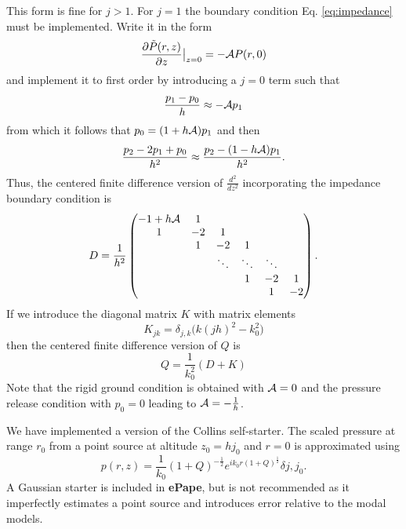 This form is fine for $j>1$. For $j=1$ the boundary condition Eq. \ref{eq:impedance} must be implemented. Write it in the form 
\[
\frac{\partial \tilde P(r,z)}{\partial z}\big|_{z=0}=-{\cal A}P(r,0)
\]
and implement it to first order by introducing a $j=0$ term such that 
\[
\frac{p_1-p_0}{h}\approx -{\cal A}p_1
\]
from which it follows that $p_0=(1+h{\cal A})p_1$ and then 
\[
\frac{p_{2}-2p_1+p_0}{h^2}\approx \frac{p_{2}-(1-h{\cal A})p_1}{h^2}.
\]
Thus, the centered finite difference version of $\frac{d^2}{dz^2}$ incorporating the impedance boundary condition is 
\begin{equation}\label{eq:Discrete_d^2}
D=
\frac{1}{h^2}\begin{pmatrix}
-1+h{\cal A}&1& &&&\\
1&-2&1&&&\\
&1&-2&1&&\\
&&\ddots&\ddots&\ddots&\\
&&& 1&-2&1\\
&&& &1&-2
\end{pmatrix}.
\end{equation}
If we introduce the diagonal matrix $K$ with matrix elements 
\[
K_{jk}=\delta_{j,k} \Big(k(jh)^2-k_0^2)
\]
then the centered finite difference version of $Q$ is 
\begin{equation} 
Q=\frac{1}{k_0^2}(D+K)
\label{eq:Q_FD_matrix_def}\end{equation}
Note that the rigid ground condition is obtained with ${\cal A}=0$ and the pressure release condition with $p_0=0$ leading to ${\cal A}=-\frac{1}{h}$.

We have implemented a version of the Collins self-starter\cite{collins1992self,collins1999stabilized}. The scaled pressure at range $r_0$ from a point source at altitude $z_0=hj_0$ and $r=0$ is approximated using 
\[
p(r,z)=\frac{1}{k_0}(1+Q)^{-\frac{1}{2}} e^{ik_0 r (1+Q)^{\frac{1}{2}}}\delta{j,j_0}. 
\]
A Gaussian starter is included in {\bf ePape}, but is not recommended as it imperfectly estimates a point source and introduces error relative to the modal models. 

